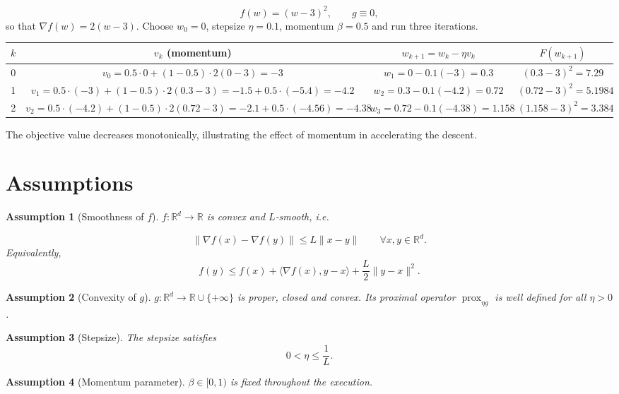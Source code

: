 \documentclass{article}
\newtheorem{assumption}{Assumption}
\newcommand{\prox}{\operatorname{prox}}
\begin{document}
\[
f(w)=(w-3)^{2},\qquad g\equiv0,
\]
so that $\nabla f(w)=2(w-3)$.  
Choose $w_{0}=0$, stepsize $\eta=0.1$, momentum $\beta=0.5$ and run three iterations.

\begin{center}
\begin{tabular}{c|c|c|c}
$k$ & $v_{k}$ (momentum) & $w_{k+1}=w_{k}-\eta v_{k}$ & $F(w_{k+1})$\\ \hline
0 & $v_{0}=0.5\cdot0+(1-0.5)\cdot2(0-3)=-3$ & $w_{1}=0-0.1(-3)=0.3$ & $(0.3-3)^{2}=7.29$\\
1 & $v_{1}=0.5\cdot(-3)+(1-0.5)\cdot2(0.3-3)=-1.5+0.5\cdot(-5.4)=-4.2$ & $w_{2}=0.3-0.1(-4.2)=0.72$ & $(0.72-3)^{2}=5.1984$\\
2 & $v_{2}=0.5\cdot(-4.2)+(1-0.5)\cdot2(0.72-3)=-2.1+0.5\cdot(-4.56)=-4.38$ & $w_{3}=0.72-0.1(-4.38)=1.158$ & $(1.158-3)^{2}=3.384$\\
\end{tabular}
\end{center}
The objective value decreases monotonically, illustrating the effect of momentum in accelerating the descent.

\newpage
\section*{Assumptions}
\begin{assumption}[Smoothness of $f$]\label{as:smooth}
$f:\mathbb{R}^{d}\to\mathbb{R}$ is convex and $L$‑smooth, i.e.  

\[
\|\nabla f(x)-\nabla f(y)\|\le L\|x-y\|\qquad\forall x,y\in\mathbb{R}^{d}.
\]
Equivalently,
\[
f(y)\le f(x)+\langle\nabla f(x),y-x\rangle+\frac{L}{2}\|y-x\|^{2}. \tag{3}
\]
\end{assumption}

\begin{assumption}[Convexity of $g$]\label{as:convex}
$g:\mathbb{R}^{d}\to\mathbb{R}\cup\{+\infty\}$ is proper, closed and convex. Its proximal operator $\prox_{\eta g}$ is well defined for all $\eta>0$.
\end{assumption}

\begin{assumption}[Stepsize]\label{as:stepsize}
The stepsize satisfies 
\[
0<\eta\le\frac{1}{L}. 
\]
\end{assumption}

\begin{assumption}[Momentum parameter]\label{as:beta}
$\beta\in[0,1)$ is fixed throughout the execution.
\end{assumption}
\end{document}
